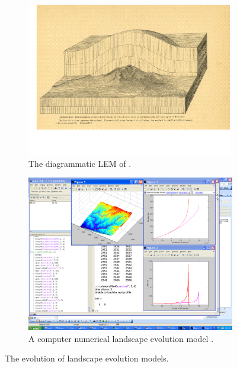 \begin{figure}
\begin{subfigure}[b]{0.7\textwidth}
\includegraphics[width=\textwidth]{LEMFinalRevisedmanuscriptDAVFinalrevisions-img/LEMFinalRevisedmanuscriptDAVFinalrevisions-img001.png} 
\caption{The diagrammatic LEM of \citet{Gilbert1877}.}
\label{gilbert_fig}
\end{subfigure}%

\begin{subfigure}[b]{0.7\textwidth}
\includegraphics[width=\textwidth]{LEMFinalRevisedmanuscriptDAVFinalrevisions-img/LEMFinalRevisedmanuscriptDAVFinalrevisions-img002.png} 
\caption{A computer numerical landscape evolution model \citep[CHILD,][]{Tucker2001}.}
\label{child_fig}
\end{subfigure}

\caption{The evolution of landscape evolution models.} 
\label{fig_gilbert_child}
\end{figure}




